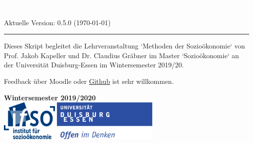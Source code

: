 \onehalfspacing
{}

\begin{titlepage}
\BgThispage
{}
\vspace*{2cm}
\noindent
\textcolor{white}{\bigsf R für die \mbox{sozioökonomische} Forschung}
\vspace*{1.0cm}\par
Aktuelle Version: 0.5.0 (\today)\\
\vspace*{2.0cm}\par
\noindent
\begin{minipage}{0.35\linewidth}
    \begin{flushright}
        \printauthor
    \end{flushright}
\end{minipage} \hspace{15pt}
%
\begin{minipage}{0.02\linewidth}
    \rule{1pt}{175pt}
\end{minipage} \hspace{-10pt}
%
\begin{minipage}{0.6\linewidth}
\vspace{5pt}
\begin{adjustwidth}{25pt}{25pt}
\raggedright
Dieses Skript begleitet die Lehrveranstaltung `Methoden der Sozioökonomie` von
Prof. Jakob Kapeller und Dr. Claudius Gräbner im Master `Sozioökonomie` an der
Universität Duisburg-Essen im Wintersemester 2019/20.

Feedback über Moodle oder
\href{https://github.com/graebnerc/RforSocioEcon}{Github} ist
sehr willkommen.
\end{adjustwidth}

\end{minipage}

\vspace{0.25cm}
\centering
\vspace{1.25cm}
\textbf{Wintersemester 2019/2020}\\
\vfill
\includegraphics[height=2cm]{figures/ifso_logo_dt_RGB} \hspace{2cm}
\includegraphics[height=2cm]{figures/logo_ude.pdf}
\end{titlepage}

\newpage
{}
